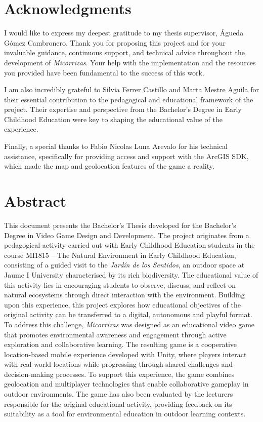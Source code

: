 
\chapter*{Acknowledgments}

I would like to express my deepest gratitude to my thesis supervisor, Águeda Gómez Cambronero. Thank you for proposing this project and for your invaluable guidance, continuous support, and technical advice throughout the development of \textit{Micorrizas}. Your help with the implementation and the resources you provided have been fundamental to the success of this work.

I am also incredibly grateful to Silvia Ferrer Castillo and Marta Mestre Aguila for their essential contribution to the pedagogical and educational framework of the project. Their expertise and perspective from the Bachelor's Degree in Early Childhood Education were key to shaping the educational value of the experience.

Finally, a special thanks to Fabio Nicolas Luna Arevalo for his technical assistance, specifically for providing access and support with the ArcGIS SDK, which made the map and geolocation features of the game a reality.

\clearpage

\chapter*{Abstract}
This document presents the Bachelor’s Thesis developed for the Bachelor’s Degree in Video Game Design and Development. The project originates from a pedagogical activity carried out with Early Childhood Education students in the course MI1815 – The Natural Environment in Early Childhood Education, consisting of a guided visit to the \textit{Jardín de los Sentidos}, an outdoor space at Jaume I University characterised by its rich biodiversity. The educational value of this activity lies in encouraging students to observe, discuss, and reflect on natural ecosystems through direct interaction with the environment.
Building upon this experience, this project explores how educational objectives of the original activity can be transferred to a digital, autonomous and playful format. To address this challenge, \textit{Micorrizas} was designed as an educational video game that promotes environmental awareness and engagement through active exploration and collaborative learning.
The resulting game is a cooperative location-based mobile experience developed with Unity, where players interact with real-world locations while progressing through shared challenges and decision-making processes. To support this experience, the game combines geolocation and multiplayer technologies that enable collaborative gameplay in outdoor environments. The game has also been evaluated by the lecturers responsible for the original educational activity, providing feedback on its suitability as a tool for environmental education in outdoor learning contexts.

